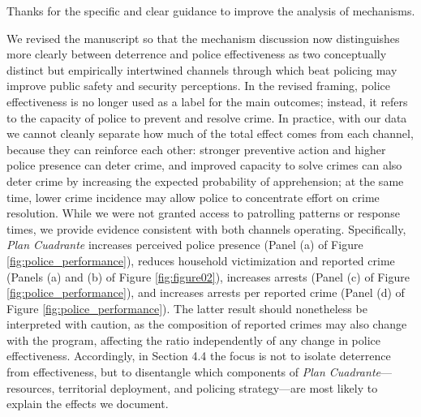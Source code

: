 

Thanks for the specific and clear guidance to improve the analysis of mechanisms.

We revised the manuscript so that the mechanism discussion now distinguishes more clearly between deterrence and police effectiveness as two conceptually distinct but empirically intertwined channels through which beat policing may improve public safety and security perceptions. In the revised framing, police effectiveness is no longer used as a label for the main outcomes; instead, it refers to the capacity of police to prevent and resolve crime. In practice, with our data we cannot cleanly separate how much of the total effect comes from each channel, because they can reinforce each other: stronger preventive action and higher police presence can deter crime, and improved capacity to solve crimes can also deter crime by increasing the expected probability of apprehension; at the same time, lower crime incidence may allow police to concentrate effort on crime resolution. While we were not granted access to patrolling patterns or response times, we provide evidence consistent with both channels operating. Specifically, \emph{Plan Cuadrante} increases perceived police presence (Panel (a) of Figure \ref{fig:police_performance}), reduces household victimization and reported crime (Panels (a) and (b) of Figure \ref{fig:figure02}), increases arrests (Panel (c) of Figure \ref{fig:police_performance}), and increases arrests per reported crime (Panel (d) of Figure \ref{fig:police_performance}). The latter result should nonetheless be interpreted with caution, as the composition of reported crimes may also change with the program, affecting the ratio independently of any change in police effectiveness. Accordingly, in Section 4.4 the focus is not to isolate deterrence from effectiveness, but to disentangle which components of \emph{Plan Cuadrante}---resources, territorial deployment, and policing strategy---are most likely to explain the effects we document.

